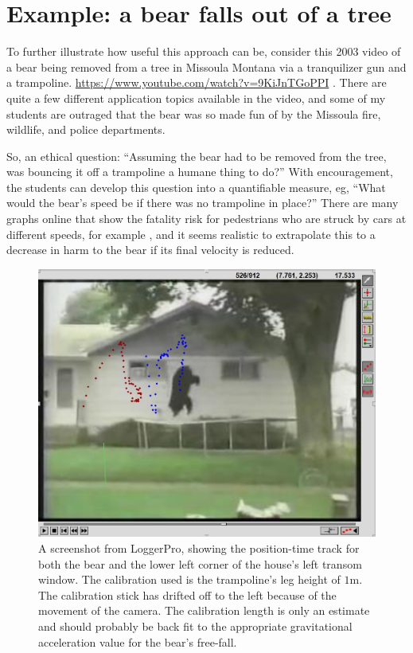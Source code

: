 \documentclass[12pt]{iopart}
\begin{document}
\clearpage

\section{Example: a bear falls out of a tree}
To further illustrate how useful this approach can be, consider this 2003 video of a bear being removed from a tree in Missoula Montana via a tranquilizer gun and a trampoline. \url{https://www.youtube.com/watch?v=9KiJnTGoPPI} \cite{bear_video_source}.  
There are quite a few different application topics available in the video, and some of my students are outraged that the bear was so made fun of by the Missoula fire, wildlife, and police departments.  

So, an ethical question: ``Assuming the bear had to be removed from the tree, was bouncing it off a trampoline a humane thing to do?''  With encouragement, the students can develop this question into a quantifiable measure, eg, ``What would the bear's speed be if there was no trampoline in place?''  There are many graphs online that show the fatality risk for pedestrians who are struck by cars at different speeds, for example \cite{AccidentRisk}, and it seems realistic to extrapolate this to a decrease in harm to the bear if its final velocity is reduced.

\begin{figure}[h]
\centering
\includegraphics[width=\columnwidth]{figure_6_bear-dots.jpg}
\caption{
A screenshot from LoggerPro, showing the position-time track for both the bear and the lower left corner of the house's left transom window. The calibration used is the trampoline's leg height of $1$m.  The calibration stick has drifted off to the left because of the movement of the camera.  The calibration length is only an estimate and should probably be back fit to the appropriate gravitational acceleration value for the bear's free-fall.
}
\label{bear-dots}
\end{figure}
\end{document}
